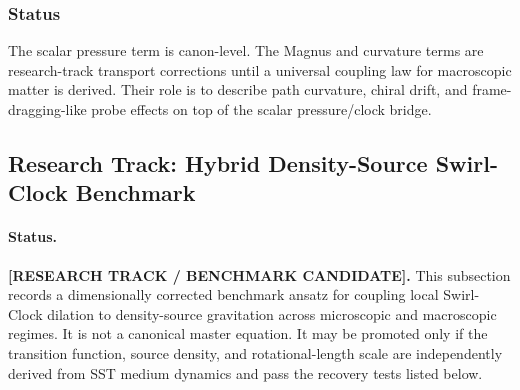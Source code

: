 \subsubsection{Status}
    The scalar pressure term is canon-level. The Magnus and curvature terms are
    research-track transport corrections until a universal coupling law for
    macroscopic matter is derived. Their role is to describe path curvature,
    chiral drift, and frame-dragging-like probe effects on top of the scalar
    pressure/clock bridge.
    
    


\subsection{Research Track: Hybrid Density-Source Swirl-Clock Benchmark}
\label{app:research_hybrid_density_source_swirl_clock}

\providecommand{\swirlarrow}{\boldsymbol{\circlearrowleft}}
\providecommand{\vswirl}{\mathbf{v}_{\!\boldsymbol{\circlearrowleft}}}
\providecommand{\rhoF}{\rho_{\!f}}
\providecommand{\rhoE}{\rho_{\!E}}
\providecommand{\rhoM}{\rho_{\!m}}
\providecommand{\SwirlClock}{S_{(t)}^{\boldsymbol{\circlearrowleft}}}

\paragraph{Status.}
\textbf{[RESEARCH TRACK / BENCHMARK CANDIDATE].}
This subsection records a dimensionally corrected benchmark ansatz for coupling
local Swirl-Clock dilation to density-source gravitation across microscopic and
macroscopic regimes.  It is not a canonical master equation.  It may be promoted
only if the transition function, source density, and rotational-length scale are
independently derived from SST medium dynamics and pass the recovery tests
listed below.

